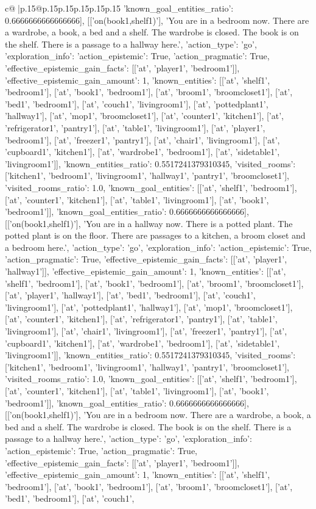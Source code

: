 \documentclass{article}
\begin{document}
{\begin{supertabular}{c@{$\;$}|p{.15\linewidth}@{}p{.15\linewidth}p{.15\linewidth}p{.15\linewidth}p{.15\linewidth}p{.15\linewidth}}
{{{'known_goal_entities_ratio': 0.6666666666666666}}], [['on(book1,shelf1)'], 'You are in a bedroom now. There are a wardrobe, a book, a bed and a shelf. The wardrobe is closed. The book is on the shelf. There is a passage to a hallway here.', {'action_type': 'go', 'exploration_info': {'action_epistemic': True, 'action_pragmatic': True, 'effective_epistemic_gain_facts': [['at', 'player1', 'bedroom1']], 'effective_epistemic_gain_amount': 1, 'known_entities': [['at', 'shelf1', 'bedroom1'], ['at', 'book1', 'bedroom1'], ['at', 'broom1', 'broomcloset1'], ['at', 'bed1', 'bedroom1'], ['at', 'couch1', 'livingroom1'], ['at', 'pottedplant1', 'hallway1'], ['at', 'mop1', 'broomcloset1'], ['at', 'counter1', 'kitchen1'], ['at', 'refrigerator1', 'pantry1'], ['at', 'table1', 'livingroom1'], ['at', 'player1', 'bedroom1'], ['at', 'freezer1', 'pantry1'], ['at', 'chair1', 'livingroom1'], ['at', 'cupboard1', 'kitchen1'], ['at', 'wardrobe1', 'bedroom1'], ['at', 'sidetable1', 'livingroom1']], 'known_entities_ratio': 0.5517241379310345, 'visited_rooms': ['kitchen1', 'bedroom1', 'livingroom1', 'hallway1', 'pantry1', 'broomcloset1'], 'visited_rooms_ratio': 1.0, 'known_goal_entities': [['at', 'shelf1', 'bedroom1'], ['at', 'counter1', 'kitchen1'], ['at', 'table1', 'livingroom1'], ['at', 'book1', 'bedroom1']], 'known_goal_entities_ratio': 0.6666666666666666}}], [['on(book1,shelf1)'], 'You are in a hallway now. There is a potted plant. The potted plant is on the floor. There are passages to a kitchen, a broom closet and a bedroom here.', {'action_type': 'go', 'exploration_info': {'action_epistemic': True, 'action_pragmatic': True, 'effective_epistemic_gain_facts': [['at', 'player1', 'hallway1']], 'effective_epistemic_gain_amount': 1, 'known_entities': [['at', 'shelf1', 'bedroom1'], ['at', 'book1', 'bedroom1'], ['at', 'broom1', 'broomcloset1'], ['at', 'player1', 'hallway1'], ['at', 'bed1', 'bedroom1'], ['at', 'couch1', 'livingroom1'], ['at', 'pottedplant1', 'hallway1'], ['at', 'mop1', 'broomcloset1'], ['at', 'counter1', 'kitchen1'], ['at', 'refrigerator1', 'pantry1'], ['at', 'table1', 'livingroom1'], ['at', 'chair1', 'livingroom1'], ['at', 'freezer1', 'pantry1'], ['at', 'cupboard1', 'kitchen1'], ['at', 'wardrobe1', 'bedroom1'], ['at', 'sidetable1', 'livingroom1']], 'known_entities_ratio': 0.5517241379310345, 'visited_rooms': ['kitchen1', 'bedroom1', 'livingroom1', 'hallway1', 'pantry1', 'broomcloset1'], 'visited_rooms_ratio': 1.0, 'known_goal_entities': [['at', 'shelf1', 'bedroom1'], ['at', 'counter1', 'kitchen1'], ['at', 'table1', 'livingroom1'], ['at', 'book1', 'bedroom1']], 'known_goal_entities_ratio': 0.6666666666666666}}], [['on(book1,shelf1)'], 'You are in a bedroom now. There are a wardrobe, a book, a bed and a shelf. The wardrobe is closed. The book is on the shelf. There is a passage to a hallway here.', {'action_type': 'go', 'exploration_info': {'action_epistemic': True, 'action_pragmatic': True, 'effective_epistemic_gain_facts': [['at', 'player1', 'bedroom1']], 'effective_epistemic_gain_amount': 1, 'known_entities': [['at', 'shelf1', 'bedroom1'], ['at', 'book1', 'bedroom1'], ['at', 'broom1', 'broomcloset1'], ['at', 'bed1', 'bedroom1'], ['at', 'couch1', }}}
\end{supertabular}}
\end{document}
